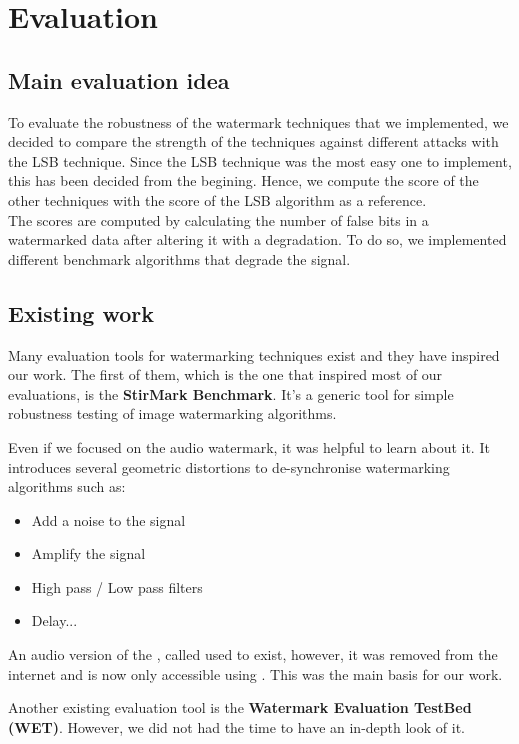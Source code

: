 \chapter{Evaluation}
\section{Main evaluation idea}
To evaluate the robustness of the watermark techniques that we implemented, we decided to compare the strength of the techniques against different attacks with the \ac{LSB} technique. Since the \ac{LSB} technique was the most easy one to implement, this has been decided from the begining. Hence, we compute the score of the other techniques with the score of the \ac{LSB} algorithm as a reference. \\

The scores are computed by calculating the number of false bits in a watermarked data after altering it with a degradation. To do so, we implemented different benchmark algorithms that degrade the signal. \\
\section{Existing work}
Many evaluation tools for watermarking techniques exist and they have inspired our work. 
The first of them, which is the one that inspired most of our evaluations, is the \textbf{StirMark Benchmark}. It's a generic tool for simple robustness testing of image watermarking algorithms. 

Even if we focused on the audio watermark, it was helpful to learn about it. It introduces several geometric distortions to de-synchronise watermarking algorithms such as:
\begin{itemize}
 \item Add a noise to the signal
 \item Amplify  the signal
 \item High pass / Low pass filters
 \item Delay...
\end{itemize}

An audio version of the , called  used to exist, however, it was removed from the internet and is now only accessible using . This was the main basis for our work.

Another existing evaluation tool is the \textbf{Watermark Evaluation TestBed (WET)}. However, we did not had the time to have an in-depth look of it.

